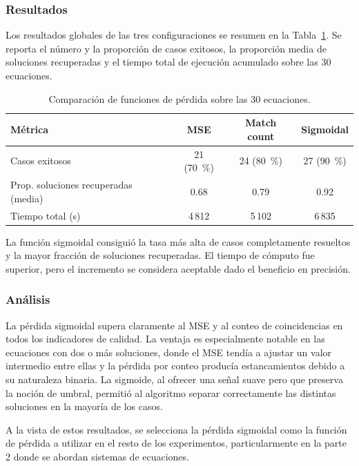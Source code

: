 \documentclass[12pt,a4paper]{article} \usepackage[utf8]{inputenc} \usepackage[spanish]{babel} \usepackage{amsmath, amssymb, amsthm} \usepackage{bm} \usepackage{float} \usepackage{longtable} \usepackage[hidelinks]{hyperref}
\begin{document}
\subsubsection{Resultados}

Los resultados globales de las tres configuraciones se resumen en la Tabla~\ref{tab:comparacion_perdida}. Se reporta el número y la proporción de casos exitosos, la proporción media de soluciones recuperadas y el tiempo total de ejecución acumulado sobre las 30 ecuaciones.

\begin{table}[H]
\centering \caption{Comparación de funciones de pérdida sobre las 30 ecuaciones.} \label{tab:comparacion_perdida}
\begin{tabular}{lccc}
\hline Métrica & MSE & Match count & Sigmoidal \\
\hline Casos exitosos & 21 (70~\%) & 24 (80~\%) & 27 (90~\%) \\
Prop. soluciones recuperadas (media) & 0.68 & 0.79 & 0.92 \\
Tiempo total (s) & 4\,812 & 5\,102 & 6\,835 \\
\hline
\end{tabular}
\end{table}

La función sigmoidal consiguió la tasa más alta de casos completamente resueltos y la mayor fracción de soluciones recuperadas. El tiempo de cómputo fue superior, pero el incremento se considera aceptable dado el beneficio en precisión.

\subsubsection{Análisis}

La pérdida sigmoidal supera claramente al MSE y al conteo de coincidencias en todos los indicadores de calidad. La ventaja es especialmente notable en las ecuaciones con dos o más soluciones, donde el MSE tendía a ajustar un valor intermedio entre ellas y la pérdida por conteo producía estancamientos debido a su naturaleza binaria. La sigmoide, al ofrecer una señal suave pero que preserva la noción de umbral, permitió al algoritmo separar correctamente las distintas soluciones en la mayoría de los casos.

A la vista de estos resultados, se selecciona la pérdida sigmoidal como la función de pérdida a utilizar en el resto de los experimentos, particularmente en la parte 2 donde se abordan sistemas de ecuaciones.
\end{document}
